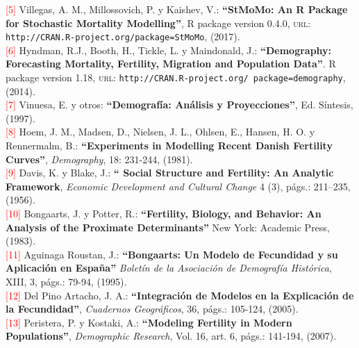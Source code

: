 \noindent \textcolor{red}{[5]} Villegas, A. M., Millossovich, P. y Kaishev, V.: \textbf{``StMoMo: An R Package for Stochastic Mortality Modelling''}, R package version 0.4.0, \textsc{url:} \texttt{http://CRAN.R-project.org/package=StMoMo}, (2017). \\

\noindent \textcolor{red}{[6]} Hyndman, R.J., Booth, H., Tickle, L. y Maindonald, J.: \textbf{``Demography: Forecasting Mortality, Fertility, Migration and Population Data''}. R package version 1.18, \textsc{url:}  \texttt{http://CRAN.R-project.org/
package=demography}, (2014).\\

\noindent \textcolor{red}{[7]} Vinuesa, E. y otros: \textbf{``Demografía: Análisis y Proyecciones''}, Ed. Síntesis, (1997).\\

\noindent \textcolor{red}{[8]} Hoem, J. M., Madsen, D., Nielsen, J. L., Ohlsen, E., Hansen, H. O. y Rennermalm, B.: \textbf{``Experiments in Modelling Recent Danish Fertility Curves''}, \textit{Demography}, 18: 231-244, (1981).\\ 

\noindent \textcolor{red}{[9]} Davis, K. y Blake, J.: \textbf{`` Social Structure and Fertility: An Analytic Framework}, \textit{Economic Development and Cultural Change} 4 (3), págs.: 211–235, (1956).\\

\noindent \textcolor{red}{[10]} Bongaarts, J. y Potter, R.: \textbf{``Fertility, Biology, and Behavior: An Analysis of the Proximate Determinants''} New York: Academic Press, (1983).\\

\noindent \textcolor{red}{[11]} Aguinaga Roustan, J.: \textbf{``Bongaarts: Un Modelo de Fecundidad y su Aplicación en España''} \textit{Boletín de la Asociación de Demografía Histórica}, XIII, 3, págs.: 79-94, (1995).\\

\noindent \textcolor{red}{[12]} Del Pino Artacho, J. A.: \textbf{``Integración de Modelos en la Explicación de la Fecundidad''}, \textit{Cuadernos Geográficos}, 36, págs.: 105-124, (2005).\\

\noindent \textcolor{red}{[13]} Peristera, P. y Kostaki, A.: \textbf{``Modeling Fertility in Modern Populations''}, \textit{Demographic Research}, Vol. 16, art. 6, págs.: 141-194, (2007).\\

